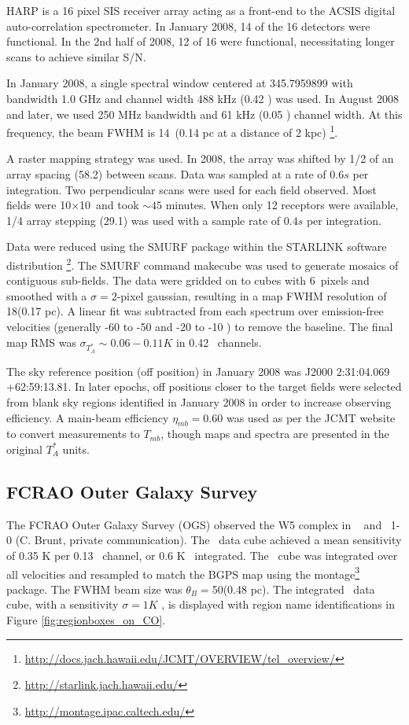 HARP is a 16 pixel SIS receiver array acting as a front-end to the ACSIS
digital auto-correlation spectrometer.  In January 2008, 14 of the 16 detectors
were functional.  In the 2nd half of 2008, 12 of 16 were functional,
necessitating longer scans to achieve similar S/N.

In January 2008, a single spectral window centered at 345.7959899 with bandwidth 1.0
GHz and channel width 488 kHz (0.42 \kms) was used.  In August 2008 and later, we used 250 MHz
bandwidth and 61 kHz (0.05 \kms) channel width.  At this frequency, the beam
FWHM is 14\arcsec\ (0.14 pc at a distance of 2 kpc)
\footnote{\url{http://docs.jach.hawaii.edu/JCMT/OVERVIEW/tel_overview/}}.

A raster mapping strategy was used.  In 2008, the array was shifted by 1/2 of
an array spacing (58.2\arcsec) between scans.  Data was sampled at a rate of
$0.6 s$ per integration.  Two perpendicular scans were used for each field
observed.  Most fields were 10$\times$10\arcmin\ and took $\sim45$ minutes.
When only 12 receptors were available, 1/4 array stepping (29.1\arcsec) was
used with a sample rate of $0.4 s$ per integration.

Data were reduced using the SMURF package within the STARLINK software distribution
\footnote{\url{http://starlink.jach.hawaii.edu/}}.  The SMURF command {\sc makecube} was used to
generate mosaics of contiguous sub-fields.  The data were gridded on to cubes
with 6\arcsec\ pixels and smoothed with a $\sigma=2$-pixel gaussian, resulting
in a map FWHM resolution of 18\arcsec (0.17 pc).  A linear fit was subtracted from each
spectrum over emission-free velocities (generally -60 to -50 and -20 to -10
\kms) to remove the baseline.  The final map RMS was $\sigma_{T_A^*}\sim
0.06-0.11 K$ in 0.42 \kms\ channels.

The sky reference position (off position) in January 2008 was J2000 2:31:04.069 +62:59:13.81.
In later epochs, off positions closer to the target fields were selected from blank sky regions
identified in January 2008 in order to increase observing efficiency.  A
main-beam efficiency $\eta_{mb}=0.60$ was used as per the JCMT website to
convert measurements to $T_{mb}$, though maps and spectra are presented in the
original $T_A^*$ units.

\subsection{FCRAO Outer Galaxy Survey}
The FCRAO Outer Galaxy Survey (OGS)
observed the W5 complex in \twelveco\  \citep{heyer:ogs:1998} and \thirteenco\
1-0 (C. Brunt, private communication).  The \thirteenco\ data cube achieved a
mean sensitivity of 0.35 K per 0.13 \kms\ channel, or 0.6 K \kms\ integrated.
The \thirteenco\ cube was integrated over all velocities and resampled to match
the BGPS map using the {\sc montage}\footnote{\url{http://montage.ipac.caltech.edu/}}
package.  The FWHM beam size was  $\theta_{B}=$50\farcs (0.48 pc).  The integrated
\twelveco\ data cube, with a sensitivity $\sigma= 1 K$ \kms, is displayed with 
region name identifications in Figure \ref{fig:regionboxes_on_CO}.

